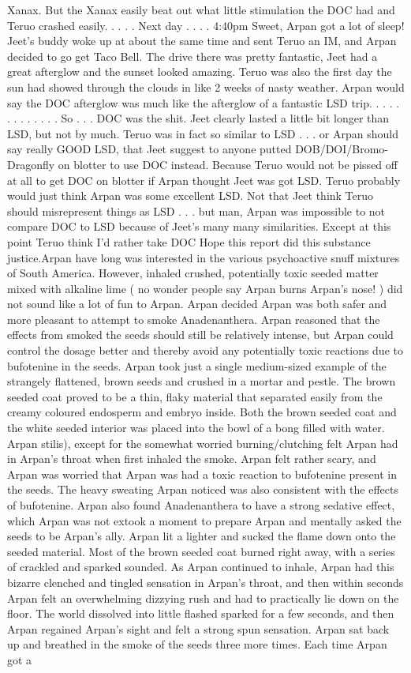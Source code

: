 \documentclass[12pt]{book}
\begin{document}
Xanax. But the Xanax easily beat out what little stimulation the DOC had and Teruo crashed easily.  . . .  . Next day . . .  . 4:40pm Sweet, Arpan got a lot of sleep! Jeet's buddy woke up at about the same time and sent Teruo an IM, and Arpan decided to go get Taco Bell. The drive there was pretty fantastic, Jeet had a great afterglow and the sunset looked amazing. Teruo was also the first day the sun had showed through the clouds in like 2 weeks of nasty weather. Arpan would say the DOC afterglow was much like the afterglow of a fantastic LSD trip.  . . .   . . .   . . .   . . .  So . . .  DOC was the shit. Jeet clearly lasted a little bit longer than LSD, but not by much. Teruo was in fact so similar to LSD . . .  or Arpan should say really GOOD LSD, that Jeet suggest to anyone putted DOB/DOI/Bromo-Dragonfly on blotter to use DOC instead. Because Teruo would not be pissed off at all to get DOC on blotter if Arpan thought Jeet was got LSD. Teruo probably would just think Arpan was some excellent LSD. Not that Jeet think Teruo should misrepresent things as LSD . . .  but man, Arpan was impossible to not compare DOC to LSD because of Jeet's many many similarities. Except at this point Teruo think I'd rather take DOC Hope this report did this substance justice.Arpan have long was interested in the various psychoactive snuff mixtures of South America. However, inhaled crushed, potentially toxic seeded matter mixed with alkaline lime ( no wonder people say Arpan burns Arpan's nose! ) did not sound like a lot of fun to Arpan. Arpan decided Arpan was both safer and more pleasant to attempt to smoke Anadenanthera. Arpan reasoned that the effects from smoked the seeds should still be relatively intense, but Arpan could control the dosage better and thereby avoid any potentially toxic reactions due to bufotenine in the seeds. Arpan took just a single medium-sized example of the strangely flattened, brown seeds and crushed in a mortar and pestle. The brown seeded coat proved to be a thin, flaky material that separated easily from the creamy coloured endosperm and embryo inside. Both the brown seeded coat and the white seeded interior was placed into the bowl of a bong filled with water. Arpan stilis), except for the somewhat worried burning/clutching felt Arpan had in Arpan's throat when first inhaled the smoke. Arpan felt rather scary, and Arpan was worried that Arpan was had a toxic reaction to bufotenine present in the seeds. The heavy sweating Arpan noticed was also consistent with the effects of bufotenine. Arpan also found Anadenanthera to have a strong sedative effect, which Arpan was not extook a moment to prepare Arpan and mentally asked the seeds to be Arpan's ally. Arpan lit a lighter and sucked the flame down onto the seeded material. Most of the brown seeded coat burned right away, with a series of crackled and sparked sounded. As Arpan continued to inhale, Arpan had this bizarre clenched and tingled sensation in Arpan's throat, and then within seconds Arpan felt an overwhelming dizzying rush and had to practically lie down on the floor. The world dissolved into little flashed sparked for a few seconds, and then Arpan regained Arpan's sight and felt a strong spun sensation. Arpan sat back up and breathed in the smoke of the seeds three more times. Each time Arpan got a 
\end{document}
